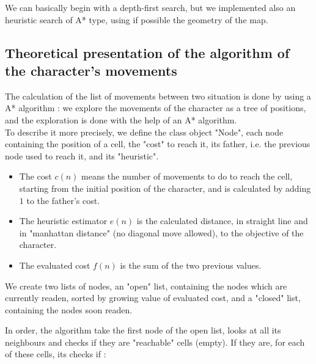 \documentclass[journal]{IEEEtran}
\begin{document}
We can basically begin with a depth-first search, but we implemented also an heuristic search of A* type, using if possible the geometry of the map.


\subsection{Theoretical presentation of the algorithm of the character's movements}

The calculation of the list of movements between two situation is done by using a A* algorithm : we explore the movements of the character as a tree of positions, and the exploration is done with the help of an A* algorithm. \\

To describe it more precisely, we define the class object "Node", each node containing the position of a cell, the "cost" to reach it, its father, i.e. the previous node used to reach it, and its "heuristic".

\begin{itemize}

\item The cost $c(n)$ means the number of movements to do to reach the cell, starting from the initial position of the character, and is calculated by adding $1$ to the father's cost.

\item The heuristic estimator $e(n)$ is the calculated distance, in straight line and in "manhattan distance" (no diagonal move allowed), to the objective of the character.

\item The evaluated cost $f(n)$ is the sum of the two previous values.

\end{itemize}

We create two lists of nodes, an "open" list, containing the nodes which are currently readen, sorted by growing value of evaluated cost, and a "closed" list, containing the nodes soon readen.

In order, the algorithm take the first node of the open list, looks at all its neighbours and checks if they are "reachable" cells (empty). If they are, for each of these cells, its checks if :\\
\end{document}
